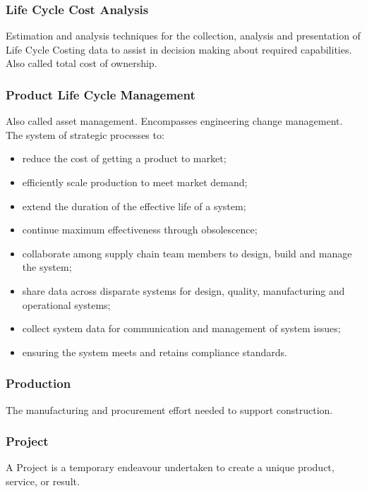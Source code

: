 \documentclass[journal]{IEEEtran}
\begin{document}
\subsubsection{Life Cycle Cost Analysis}
Estimation and analysis techniques for the collection, analysis and presentation of Life Cycle Costing data to assist in decision making about required capabilities. Also called total cost of ownership.
\subsubsection{Product Life Cycle Management}
Also called asset management. Encompasses engineering change management. The system of strategic processes to:
\begin{itemize}
	\item reduce the cost of getting a product to market;
	\item efficiently scale production to meet market demand;
	\item extend the duration of the effective life of a system;
	\item continue maximum effectiveness through obsolescence;
	\item collaborate among supply chain team members to design, build and manage the system;
		\item share data across disparate systems for design, quality, manufacturing and operational systems;
	\item collect system data for communication and management of system issues;
	\item ensuring the system meets and retains compliance standards.
\end{itemize}
\subsubsection{Production}
The manufacturing and procurement effort needed to support construction.
\subsubsection{Project}
A Project is a temporary endeavour undertaken to create a unique product, service, or result.
\end{document}
